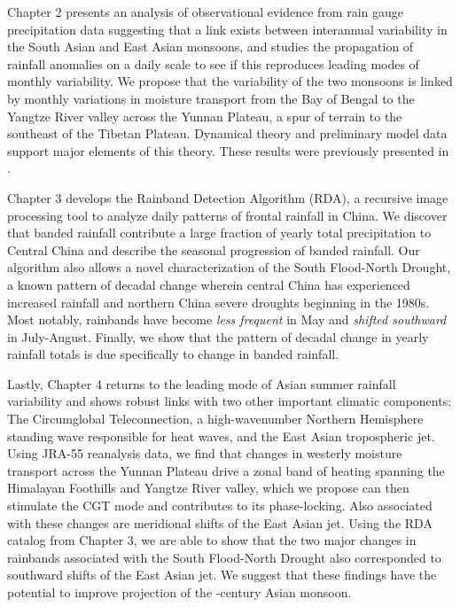 Chapter 2 presents an analysis of observational evidence from rain gauge precipitation data suggesting that a link exists between interannual variability in the South Asian and East Asian monsoons, and studies the propagation of rainfall anomalies on a daily scale to see if this reproduces leading modes of monthly variability. We propose that the variability of the two monsoons is linked by monthly variations in moisture transport from the Bay of Bengal to the Yangtze River valley across the Yunnan Plateau, a spur of terrain to the southeast of the Tibetan Plateau. Dynamical theory and preliminary model data support major elements of this theory. These results were previously presented in \citep{Day2015}.

Chapter 3 develops the Rainband Detection Algorithm (RDA), a recursive image processing tool to analyze daily patterns of frontal rainfall in China. We discover that banded rainfall contribute a large fraction of yearly total precipitation to Central China and describe the seasonal progression of banded rainfall. Our algorithm also allows a novel characterization of the South Flood-North Drought, a known pattern of decadal change wherein central China has experienced increased rainfall and northern China severe droughts beginning in the 1980s. Most notably, rainbands have become \textit{less frequent} in May and \textit{shifted southward} in July-August. Finally, we show that the pattern of decadal change in yearly rainfall totals is due specifically to change in banded rainfall.

Lastly, Chapter 4 returns to the leading mode of Asian summer rainfall variability and shows robust links with two other important climatic components: The Circumglobal Teleconnection, a high-wavenumber Northern Hemisphere standing wave responsible for heat waves, and the East Asian tropospheric jet. Using JRA-55 reanalysis data, we find that changes in westerly moisture transport across the Yunnan Plateau drive a zonal band of heating spanning the Himalayan Foothills and Yangtze River valley, which we propose can then stimulate the CGT mode and contributes to its phase-locking. Also associated with these changes are meridional shifts of the East Asian jet. Using the RDA catalog from Chapter 3, we are able to show that the two major changes in rainbands associated with the South Flood-North Drought also corresponded to southward shifts of the East Asian jet. We suggest that these findings have the potential to improve projection of the -century Asian monsoon. 

